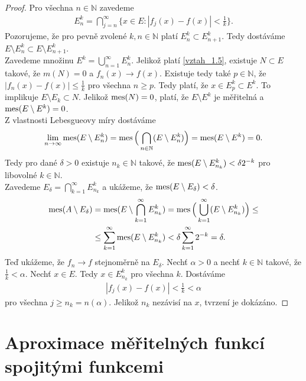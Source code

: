 \begin{proof}
Pro všechna $n \in \mathbb{N}$ zavedeme 
\begin{align*}
E_{n}^k=\bigcap \limits _{j=n}^{\infty} \{x \in E : |f_j(x)-f(x)|<\frac{1}{k}\}.
\end{align*}
Pozorujeme, že pro pevně zvolené $k,n \in \mathbb{N}$ platí $E_{n}^k \subset E_{n+1}^k $. Tedy dostáváme $E \setminus E_n^{k} \subset E \setminus E_{n+1}^{k}$.\\
Zavedeme množinu $E^{k}=\bigcup \limits _{n=1}^{\infty}E_n^k$. Jelikož platí \eqref{vztah_1.5}, existuje $N \subset E$ takové, že $m(N)=0$ a $f_n(x) \to f(x)$. Existuje tedy také $p \in \mathbb{N}$, že $|f_n(x)-f(x)| \leq \frac{1}{k}$ pro všechna $n \geq p$. Tedy platí, že $x \in E_p^{k} \subset E^k$. To implikuje $E \setminus E_k \subset N$. Jelikož $\operatorname{mes}(N)=0$, platí, že $E \setminus E^k$ je měřitelná a $\operatorname{mes}(E \setminus E^k)=0$. \\
Z vlastnosti Lebesgueovy míry dostáváme
\begin{align*}
\lim \limits _{n \to \infty} \operatorname{mes}(E \setminus E_n^k) = \operatorname{mes}\Big(\bigcap \limits _{n \in \mathbb{N}}(E \setminus E^k_n)\Big) = \operatorname{mes}(E \setminus E^k) = 0.
\end{align*}
Tedy pro dané $\delta>0$ existuje $n_k \in \mathbb{N}$ takové, že $\operatorname{mes}(E \setminus E_{n_k}^k) < \delta 2^{-k}$ pro libovolné $k \in \mathbb{N}$.\\
Zavedeme $E_{\delta}= \bigcap \limits _{k=1}^{\infty} E_{n_{k}}^k$ a ukážeme, že $\operatorname{mes}(E \setminus E_{\delta})< \delta$.
\begin{align*}
\operatorname{mes}(A\setminus E_{\delta}) &= \operatorname{mes} (E \setminus \bigcap \limits _{k=1}^{\infty} E_{n_k}^k) = \operatorname{mes} \Big(\bigcup \limits _{k=1}^{\infty} (E \setminus  E_{n_k}^k)\Big) \leq \\
&\leq \sum \limits _{k=1}^{\infty} \operatorname{mes}(E \setminus E_{n_k}^k) < \delta \sum \limits _{k=1}^{\infty} 2 ^{-k} = \delta.
\end{align*}
Teď ukážeme, že $f_n \to f$ stejnoměrně na $E_{\delta}$. Nechť $\alpha>0$ a nechť $k \in \mathbb{N}$ takové, že $\frac{1}{k} < \alpha$. Nechť $x \in E$. Tedy $x \in E^k_{n_k}$ pro všechna $k$. Dostáváme
\begin{align*}
|f_j(x)-f(x)|<\frac{1}{k}<\alpha
\end{align*}
pro všechna $j \geq n_k=n(\alpha)$. Jelikož $n_k$ nezávisí na $x$, tvrzení je dokázáno.
\end{proof}

\section{Aproximace měřitelných funkcí spojitými funkcemi}

